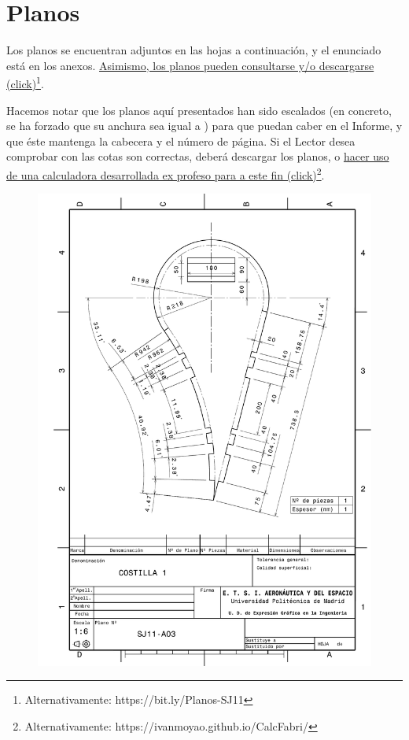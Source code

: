 \chapter{Planos}

Los planos se encuentran adjuntos en las hojas a continuación, y el enunciado está en los anexos. \href{https://upm365-my.sharepoint.com/:f:/g/personal/ivan_moya_alumnos_upm_es/Eh3mV7UC8utEuZwzAgtFWc8BU-HaaOdnn7nBxMa_h69q5g?e=zpZtlc}{Asimismo, los planos pueden consultarse y/o descargarse (click)}\footnote{Alternativamente: https://bit.ly/Planos-SJ11}. 

Hacemos notar que los planos aquí presentados han sido escalados (en concreto, se ha forzado que su anchura sea igual a \the\linewidth) para que puedan caber en el Informe, y que éste mantenga la cabecera y el número de página. Si el Lector desea comprobar con las cotas son correctas, deberá descargar los planos, o \href{https://ivanmoyao.github.io/CalcFabri/}{hacer uso de una calculadora desarrollada ex profeso para a este fin (click)}\footnote{Alternativamente: https://ivanmoyao.github.io/CalcFabri/}.


\begin{figure}
    \centering
    \includegraphics[width=\linewidth]{Figures//Planos/C1.pdf}
\end{figure}

